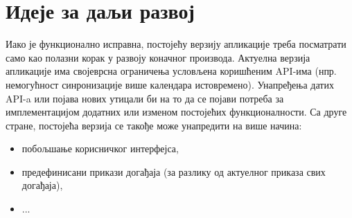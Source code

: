 \section{Идеје за даљи развој}

Иако је функционално исправна, постојећу верзију апликације треба посматрати само као полазни корак у развоју коначног производа. Актуелна верзија апликације има својеврсна ограничења условљена коришћеним API-има (нпр. немогућност синронизације више календара истовремено). Унапређења датих API-a или појава нових утицали би на то да се појави потреба за имплементацијом додатних или изменом постојећих функционалности. Са друге стране, постојећа верзија се такође може унапредити на више начина:
\begin{itemize}
	\item{побољшање корисничког интерфејса},
	\item{предефинисани прикази догађаја (за разлику од актуелног приказа свих догађаја)},
	\item{...}
\end{itemize}